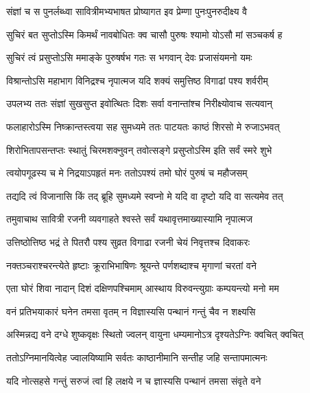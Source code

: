 \begin{center}
\twolineshloka
{संज्ञां च स पुनर्लब्ध्वा सावित्रीमभ्यभाषत}
{प्रोष्यागत इव प्रेम्णा पुनःपुनरुदीक्ष्य वै}

\twolineshloka
{सुचिरं बत सुप्तोऽस्मि किमर्थं नावबोधितः}
{क्व चासौ पुरुषः श्यामो योऽसौ मां सञ्चकर्ष ह}


\twolineshloka
{सुचिरं त्वं प्रसुप्तोऽसि ममाङ्के पुरुषर्षभ}
{गतः स भगवान् देवः प्रजासंयमनो यमः}

\twolineshloka
{विश्रान्तोऽसि महाभाग विनिद्रश्च नृपात्मज}
{यदि शक्यं समुत्तिष्ठ विगाढां पश्य शर्वरीम्}


\twolineshloka
{उपलभ्य ततः संज्ञां सुखसुप्त इवोत्थितः}
{दिशः सर्वा वनान्तांश्च निरीक्ष्योवाच सत्यवान्}

\twolineshloka
{फलाहारोऽस्मि निष्क्रान्तस्त्वया सह सुमध्यमे}
{ततः पाटयतः काष्ठं शिरसो मे रुजाऽभवत्}

\twolineshloka
{शिरोभितापसन्तप्तः स्थातुं चिरमशक्नुवन्}
{तवोत्सङ्गे प्रसुप्तोऽस्मि इति सर्वं स्मरे शुभे}

\twolineshloka
{त्वयोपगूढस्य च मे निद्रयाऽपहृतं मनः}
{ततोऽपश्यं तमो घोरं पुरुषं च महौजसम्}

\twolineshloka
{तद्यदि त्वं विजानासि किं तद् ब्रूहि सुमध्यमे}
{स्वप्नो मे यदि वा दृष्टो यदि वा सत्यमेव तत्}

\twolineshloka
{तमुवाचाथ सावित्री रजनी व्यवगाहते}
{श्वस्ते सर्वं यथावृत्तमाख्यास्यामि नृपात्मज}

\twolineshloka
{उत्तिष्ठोत्तिष्ठ भद्रं ते पितरौ पश्य सुव्रत}
{विगाढा रजनी चेयं निवृत्तश्च दिवाकरः}

\twolineshloka
{नक्तञ्चराश्चरन्त्येते हृष्टाः क्रूराभिभाषिणः}
{श्रूयन्ते पर्णशब्दाश्च मृगाणां चरतां वने}

\twolineshloka
{एता घोरं शिवा नादान् दिशं दक्षिणपश्चिमाम्}
{आस्थाय विरुवन्त्युग्राः कम्पयन्त्यो मनो मम}


\twolineshloka
{वनं प्रतिभयाकारं घनेन तमसा वृतम्}
{न विज्ञास्यसि पन्थानं गन्तुं चैव न शक्ष्यसि}


\twolineshloka
{अस्मिन्नद्य वने दग्धे शुष्कवृक्षः स्थितो ज्वलन्}
{वायुना धम्यमानोऽत्र दृश्यतेऽग्निः क्वचित् क्वचित्}

\twolineshloka
{ततोऽग्निमानयित्वेह ज्वालयिष्यामि सर्वतः}
{काष्ठानीमानि सन्तीह जहि सन्तापमात्मनः}

\twolineshloka
{यदि नोत्सहसे गन्तुं सरुजं त्वां हि लक्षये}
{न च ज्ञास्यसि पन्थानं तमसा संवृते वने}


\end{center}

